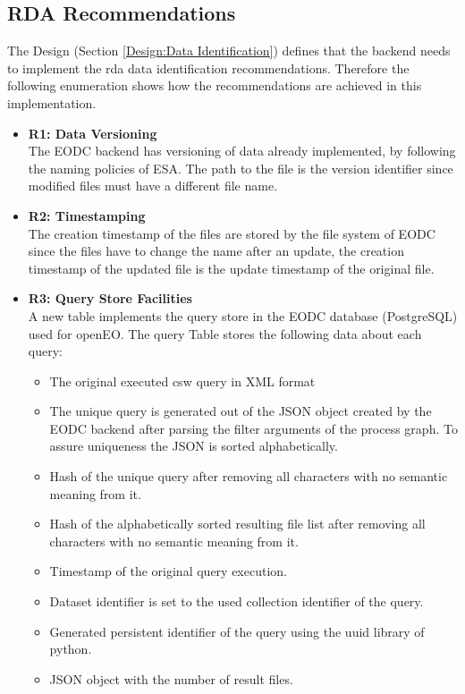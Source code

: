\documentclass[draft,final]{vutinfth} %
\begin{document}
\subsection{RDA Recommendations}\label{Evaluation:dataidentification}
The Design (Section \ref{Design:Data Identification}) defines that the backend needs to implement the \acrshort{rda} data identification recommendations. Therefore the following enumeration shows how the recommendations are achieved in this implementation. 

\begin{itemize}
	\item \textbf{R1: Data Versioning} \\
	The EODC backend has versioning of data already implemented, by following the naming policies of ESA. The path to the file is the version identifier since modified files must have a different file name.
	\item \textbf{R2: Timestamping} \\
	The creation timestamp of the files are stored by the file system of EODC since the files have to change the name after an update, the creation timestamp of the updated file is the update timestamp of the original file. 
	\item \textbf{R3: Query Store Facilities} \\
	A new table implements the query store in the EODC database (PostgreSQL) used for openEO. The query Table stores the following data about each query:
	\begin{itemize}
		\item The original executed \acrshort{csw} query in XML format
		\item The unique query is generated out of the JSON object created by the EODC backend after parsing the filter arguments of the process graph. To assure uniqueness the JSON is sorted alphabetically.
		\item Hash of the unique query after removing all characters with no semantic meaning from it.
		\item Hash of the alphabetically sorted resulting file list after removing all characters with no semantic meaning from it. 
		\item Timestamp of the original query execution.
		\item Dataset identifier is set to the used collection identifier of the query.
		\item Generated persistent identifier of the query using the uuid library of python.
		\item JSON object with the number of result files.

\end{itemize}
\end{itemize}
\end{document}
